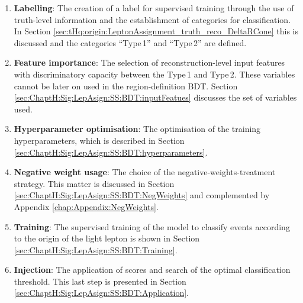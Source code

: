 \begin{enumerate}
	\item \textbf{Labelling}: The creation of a label for supervised training through the use of truth-level 
		information and the establishment of categories for classification. In 
		Section \ref{sec:tHq:origin:LeptonAssignment_truth_reco_DeltaRCone}
		this is discussed and the categories ``Type$\,$1'' and ``Type$\,$2'' are defined.
		
	\item \textbf{Feature importance}: The selection of reconstruction-level 
		input features with discriminatory capacity between the Type$\,$1 
		and Type$\,$2. These variables cannot be later on used in the region-definition BDT. 
		Section \ref{sec:ChaptH:Sig:LepAsign:SS:BDT:inputFeatues} discusses the set of variables used.
		
	\item \textbf{Hyperparameter optimisation}: The optimisation of the training 
		hyperparameters, which is described 
		in Section \ref{sec:ChaptH:Sig:LepAsign:SS:BDT:hyperparameters}.
	
	\item \textbf{Negative weight usage}: The choice of the negative-weights-treatment strategy. 
		This matter is discussed 
		in Section \ref{sec:ChaptH:Sig:LepAsign:SS:BDT:NegWeights} and complemented
		by Appendix \ref{chap:Appendix:NegWeights}.
	
	\item \textbf{Training}: The supervised training of the model to classify events according
		to the origin of the light lepton is shown in 
		Section \ref{sec:ChaptH:Sig:LepAsign:SS:BDT:Training}.

	\item \textbf{Injection}: The application of scores and search 
		of the optimal classification threshold. This last step
		is presented in Section \ref{sec:ChaptH:Sig:LepAsign:SS:BDT:Application}.
\end{enumerate}


